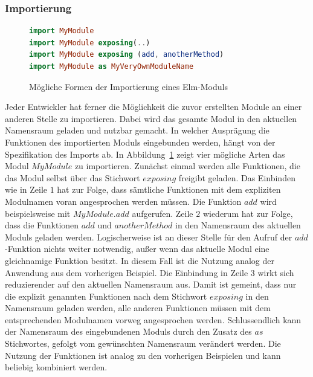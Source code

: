 \subsubsection{Importierung}
\label{sec:Importierung}
\begin{figure}[h]
\begin{lstlisting}[language=Elm]
import MyModule
import MyModule exposing(..)
import MyModule exposing (add, anotherMethod)
import MyModule as MyVeryOwnModuleName
\end{lstlisting}
\caption{Mögliche Formen der Importierung eines Elm-Moduls}\label{fig:elm-import-module}
\end{figure}
Jeder Entwickler hat ferner die Möglichkeit die zuvor erstellten Module an einer anderen Stelle zu importieren. Dabei wird das gesamte Modul in den aktuellen Namensraum geladen und nutzbar gemacht. In welcher Ausprägung die Funktionen des importierten Moduls eingebunden werden, hängt von der Spezifikation des Imports ab. In Abbildung~\ref{fig:elm-import-module} zeigt vier mögliche Arten das Modul $MyModule$ zu importieren. Zunächst einmal werden alle Funktionen, die das Modul selbst über das Stichwort $exposing$ freigibt geladen. Das Einbinden wie in Zeile $1$ hat zur Folge, dass sämtliche Funktionen mit dem expliziten Modulnamen voran angesprochen werden müssen. Die Funktion $add$ wird beispielsweise mit $MyModule.add$ aufgerufen. Zeile $2$ wiederum hat zur Folge, dass die Funktionen $add$ und $anotherMethod$ in den Namensraum des aktuellen Moduls geladen werden. Logischerweise ist an dieser Stelle für den Aufruf der $add$-Funktion nichts weiter notwendig, außer wenn das aktuelle Modul eine gleichnamige Funktion besitzt. In diesem Fall ist die Nutzung analog der Anwendung aus dem vorherigen Beispiel. Die Einbindung in Zeile $3$ wirkt sich reduzierender auf den aktuellen Namensraum aus. Damit ist gemeint, dass nur die explizit genannten Funktionen nach dem Stichwort $exposing$ in den Namensraum geladen werden, alle anderen Funktionen müssen mit dem entsprechenden Modulnamen vorweg angesprochen werden. Schlussendlich kann der Namensraum des eingebundenen Moduls durch den Zusatz des $as$ Stichwortes, gefolgt vom gewünschten Namensraum verändert werden. Die Nutzung der Funktionen ist analog zu den vorherigen Beispielen und kann beliebig kombiniert werden.


